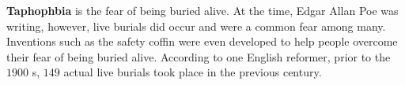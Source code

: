 
\begin{definition}[Taphophbia]
  \label{def:taphophbia}

  \textbf{Taphophbia} is the fear of being buried alive. At the time, Edgar
  Allan Poe was writing, however, live burials did occur and were a common fear
  among many. Inventions such as the safety coffin were even developed to help
  people overcome their fear of being buried alive. According to one English
  reformer, prior to the $1900$ s, $149$ actual live burials took place in the
  previous century.
\end{definition}


\newpage
